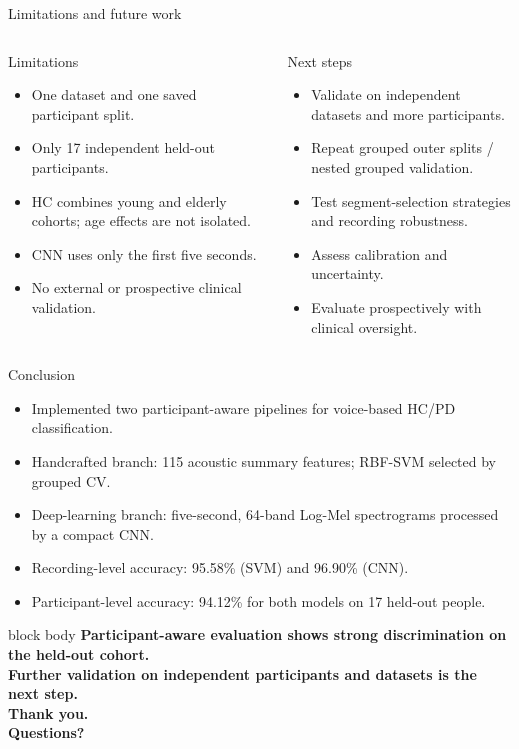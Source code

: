 \documentclass[aspectratio=169,10pt]{beamer}
\begin{document}
\begin{frame}{Limitations and future work}
\begin{columns}[T,onlytextwidth]
\begin{block}{Limitations}
\begin{itemize}
\item One dataset and one saved participant split.
\item Only 17 independent held-out participants.
\item HC combines young and elderly cohorts; age effects are not isolated.
\item CNN uses only the first five seconds.
\item No external or prospective clinical validation.
\end{itemize}
\end{block}
\begin{block}{Next steps}
\begin{itemize}
\item Validate on independent datasets and more participants.
\item Repeat grouped outer splits / nested grouped validation.
\item Test segment-selection strategies and recording robustness.
\item Assess calibration and uncertainty.
\item Evaluate prospectively with clinical oversight.
\end{itemize}
\end{block}
\end{columns}
\end{frame}

\begin{frame}{Conclusion}
\begin{itemize}
\item Implemented two participant-aware pipelines for voice-based HC/PD classification.
\item Handcrafted branch: 115 acoustic summary features; RBF-SVM selected by grouped CV.
\item Deep-learning branch: five-second, 64-band Log-Mel spectrograms processed by a compact CNN.
\item Recording-level accuracy: 95.58\% (SVM) and 96.90\% (CNN).
\item Participant-level accuracy: 94.12\% for both models on 17 held-out people.
\end{itemize}
\vspace{4mm}
\begin{beamercolorbox}[rounded=true,sep=10pt,center]{block body}
\Large\bfseries Participant-aware evaluation shows strong discrimination on the held-out cohort.\\[2mm]
\normalsize Further validation on independent participants and datasets is the next step.\\[2mm]
\normalsize Thank you.\\Questions?
\end{beamercolorbox}
\end{frame}
\end{document}
